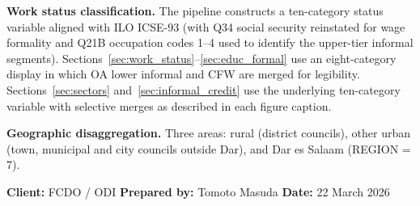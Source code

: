 \documentclass[12pt,a4paper]{article}
\begin{document}
\textbf{Work status classification.} The pipeline constructs a ten-category status variable aligned with ILO ICSE-93 (with Q34 social security reinstated for wage formality and Q21B occupation codes 1--4 used to identify the upper-tier informal segments). Sections~\ref{sec:work_status}--\ref{sec:educ_formal} use an eight-category display in which OA lower informal and CFW are merged for legibility. Sections~\ref{sec:sectors} and~\ref{sec:informal_credit} use the underlying ten-category variable with selective merges as described in each figure caption.

\textbf{Geographic disaggregation.} Three areas: rural (district councils), other urban (town, municipal and city councils outside Dar), and Dar es Salaam (REGION = 7).

\vspace{1em}
\noindent\textbf{Client:} FCDO / ODI \hfill \textbf{Prepared by:} Tomoto Masuda \hfill \textbf{Date:} 22 March 2026


\newpage


\end{document}
